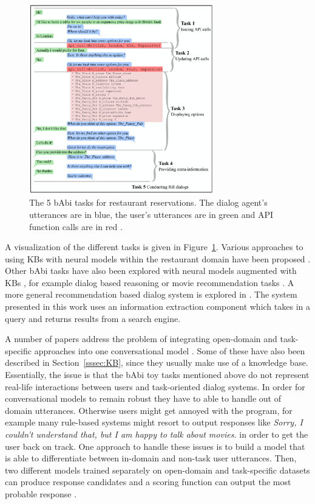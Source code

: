 \documentclass[12pt]{article}
\begin{document}
\begin{figure}[H]
	\centering
	\includegraphics[width=0.72\textwidth]{pics/babi.png}
	\caption{The 5 bAbi tasks for restaurant reservations. The dialog agent's utterances are in blue, the user's utterances are in green and API function calls are in red \cite{Bordes:2016}.}
	\label{fig:babi}
\end{figure}
A visualization of the different tasks is given in Figure~\ref{fig:babi}. Various approaches to using KBs with neural models within the restaurant domain have been proposed \cite{Wen:2016,Eric:2017,Williams:2017}. Other bAbi tasks have also been explored with neural models augmented with KBs \cite{Williams:2017,Li_HIL:2016}, for example dialog based reasoning \cite{Weston:2015} or movie recommendation tasks \cite{Miller:2016,Dodge:2015}. A more general recommendation based dialog system is explored in \cite{Yin:2017}. The system presented in this work uses an information extraction component which takes in a query and returns results from a search engine.

A number of papers address the problem of integrating open-domain and task-specific approaches into one conversational model \cite{Zhao:2017,Yu:2017,Akasaki:2017}. Some of these have also been described in Section~\ref{sssec:KB}, since they usually make use of a knowledge base. Essentially, the issue is that the bAbi toy tasks mentioned above do not represent real-life interactions between users and task-oriented dialog systems. In order for conversational models to remain robust they have to able to handle out of domain utterances. Otherwise users might get annoyed with the program, for example many rule-based systems might resort to output responses like \textit{Sorry, I couldn't understand that, but I am happy to talk about movies.} in order to get the user back on track. One approach to handle these issues is to build a model that is able to differentiate between in-domain and non-task user utterances. Then, two different models trained separately on open-domain and task-specific datasets can produce response candidates and a scoring function can output the most probable response \cite{Akasaki:2017}.
\end{document}
